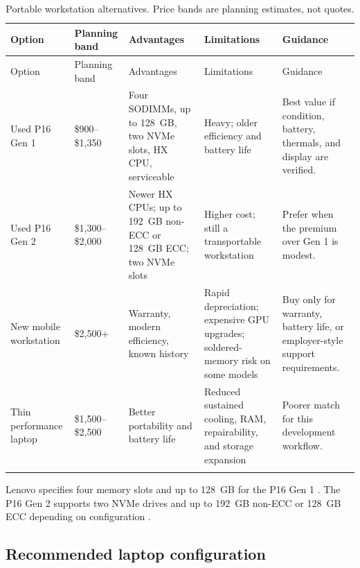 \documentclass[11pt]{article}
\begin{document}
\begin{longtable}{L{0.16\textwidth} L{0.14\textwidth} L{0.16\textwidth} L{0.17\textwidth} L{0.17\textwidth}}
\toprule
Option & Planning band & Advantages & Limitations & Guidance \\
\midrule
\endfirsthead
\toprule
Option & Planning band & Advantages & Limitations & Guidance \\
\midrule
\endhead
Used P16 Gen 1 & \$900--\$1,350 & Four SODIMMs, up to 128~GB, two NVMe slots, HX CPU, serviceable & Heavy; older efficiency and battery life & Best value if condition, battery, thermals, and display are verified. \\
Used P16 Gen 2 & \$1,300--\$2,000 & Newer HX CPUs; up to 192~GB non-ECC or 128~GB ECC; two NVMe slots & Higher cost; still a transportable workstation & Prefer when the premium over Gen 1 is modest. \\
New mobile workstation & \$2,500+ & Warranty, modern efficiency, known history & Rapid depreciation; expensive GPU upgrades; soldered-memory risk on some models & Buy only for warranty, battery life, or employer-style support requirements. \\
Thin performance laptop & \$1,500--\$2,500 & Better portability and battery life & Reduced sustained cooling, RAM, repairability, and storage expansion & Poorer match for this development workflow. \\
\bottomrule
\caption{Portable workstation alternatives. Price bands are planning estimates, not quotes.}
\end{longtable}

Lenovo specifies four memory slots and up to 128~GB for the P16 Gen 1
\cite{lenovo_p16_gen1}. The P16 Gen 2 supports two NVMe drives and up to 192~GB
non-ECC or 128~GB ECC depending on configuration \cite{lenovo_p16_gen2}.

\subsection{Recommended laptop configuration}
\end{document}
